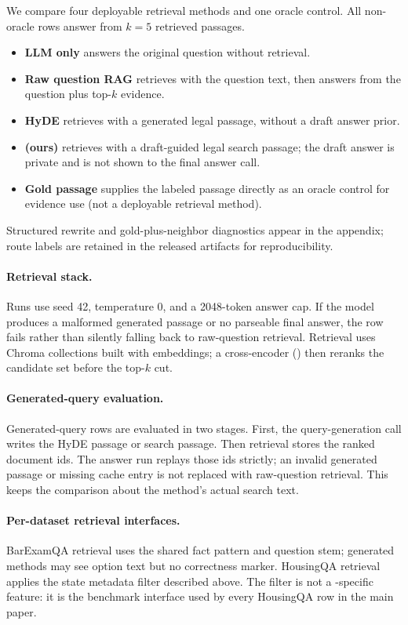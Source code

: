 We compare four deployable retrieval methods and one oracle control. All
non-oracle rows answer from $k=5$ retrieved passages.

\begin{itemize}
\item \textbf{LLM only} answers the original question without retrieval.
\item \textbf{Raw question RAG} retrieves with the question text, then
answers from the question plus top-$k$ evidence.
\item \textbf{HyDE} retrieves with a generated legal passage, without a
draft answer prior.
\item \textbf{\hyre{} (ours)} retrieves with a draft-guided legal search
passage; the draft answer is private and is not shown to the final answer
call.
\item \textbf{Gold passage} supplies the labeled passage directly as an
oracle control for evidence use (not a deployable retrieval method).
\end{itemize}

Structured rewrite and gold-plus-neighbor diagnostics appear in the
appendix; route labels are retained in the released artifacts for
reproducibility.

\paragraph{Retrieval stack.}
Runs use seed 42, temperature 0, and a 2048-token answer cap. If the model
produces a malformed generated passage or no parseable final answer, the row
fails rather than silently falling back to raw-question retrieval. Retrieval
uses Chroma collections built with 
embeddings; a cross-encoder () then reranks
the candidate set before the top-$k$ cut.

\paragraph{Generated-query evaluation.}
Generated-query rows are evaluated in two stages. First, the query-generation
call writes the HyDE passage or \hyre{} search passage. Then retrieval stores
the ranked document ids. The answer run replays those ids strictly; an
invalid generated passage or missing cache entry is not replaced with
raw-question retrieval. This keeps the comparison about the method's actual
search text.

\paragraph{Per-dataset retrieval interfaces.}
BarExamQA retrieval uses the shared fact pattern and question stem;
generated methods may see option text but no correctness marker. HousingQA
retrieval applies the state metadata filter described above. The filter is
not a \hyre{}-specific feature: it is the benchmark interface used by every
HousingQA row in the main paper.

